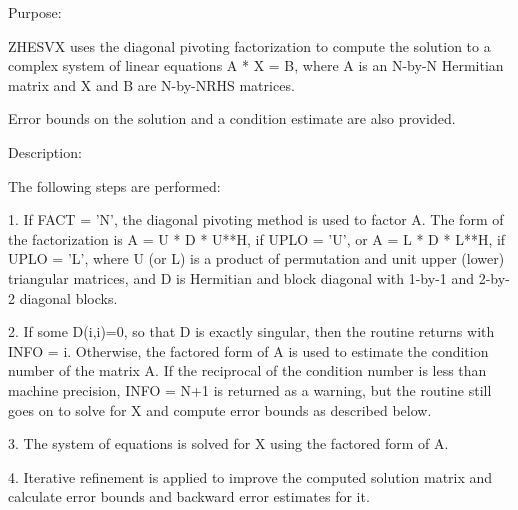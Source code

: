  \begin{DoxyParagraph}{Purpose\+: }
\begin{DoxyVerb} ZHESVX uses the diagonal pivoting factorization to compute the
 solution to a complex system of linear equations A * X = B,
 where A is an N-by-N Hermitian matrix and X and B are N-by-NRHS
 matrices.

 Error bounds on the solution and a condition estimate are also
 provided.\end{DoxyVerb}
 
\end{DoxyParagraph}
\begin{DoxyParagraph}{Description\+: }
\begin{DoxyVerb} The following steps are performed:

 1. If FACT = 'N', the diagonal pivoting method is used to factor A.
    The form of the factorization is
       A = U * D * U**H,  if UPLO = 'U', or
       A = L * D * L**H,  if UPLO = 'L',
    where U (or L) is a product of permutation and unit upper (lower)
    triangular matrices, and D is Hermitian and block diagonal with
    1-by-1 and 2-by-2 diagonal blocks.

 2. If some D(i,i)=0, so that D is exactly singular, then the routine
    returns with INFO = i. Otherwise, the factored form of A is used
    to estimate the condition number of the matrix A.  If the
    reciprocal of the condition number is less than machine precision,
    INFO = N+1 is returned as a warning, but the routine still goes on
    to solve for X and compute error bounds as described below.

 3. The system of equations is solved for X using the factored form
    of A.

 4. Iterative refinement is applied to improve the computed solution
    matrix and calculate error bounds and backward error estimates
    for it.\end{DoxyVerb}
 
\end{DoxyParagraph}

